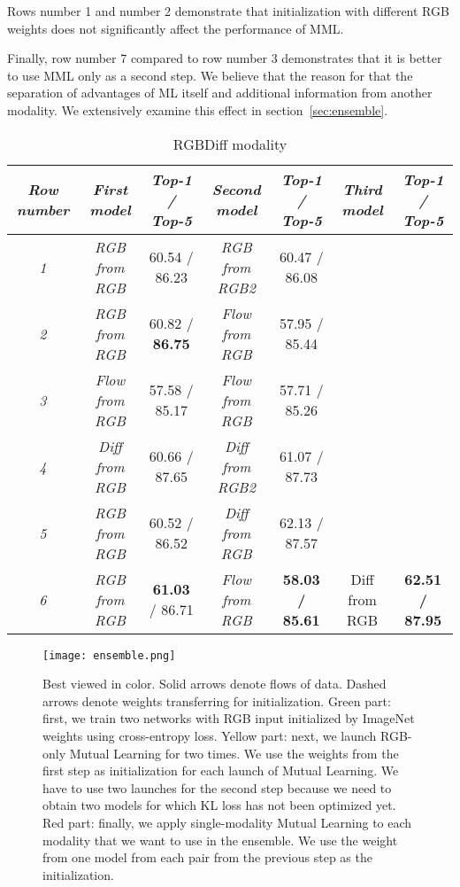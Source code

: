 \documentclass[conference]{IEEEtran}
\begin{document}
Rows number 1 and number 2 demonstrate that initialization with different RGB weights does not significantly affect the performance of MML.

Finally, row number 7 compared to row number 3 demonstrates that it is better to use MML only as a second step. We believe that the reason for that the separation of advantages of ML itself and additional information from another modality. We extensively examine this effect in section~\ref{sec:ensemble}.

\begin{table*}[!t]
	\centering
	\caption{RGBDiff modality}
	\label{tab:diff}
	\centering
	\begin{tabular}{|c|c|c|c|c|c|c|} 
		\hline \it Row number & \it First model & \it Top-1 / Top-5 & \it Second model & \it Top-1 / Top-5 & \it Third model & \it Top-1 / Top-5 \\ \hline
		\it 1 & \it RGB from RGB & 60.54 / 86.23 & \it RGB from RGB2 & 60.47 / 86.08 & & \\ \hline
		\it 2 & \it RGB from RGB & 60.82 / \textbf{86.75} & \it Flow from RGB & 57.95 / 85.44 & & \\ \hline
		\it 3 & \it Flow from RGB & 57.58 / 85.17 & \it Flow from RGB & 57.71 / 85.26 & & \\ \hline
		\it 4 & \it Diff from RGB & 60.66 / 87.65 & \it Diff from RGB2 & 61.07 / 87.73 & & \\ \hline
		\it 5 & \it RGB from RGB & 60.52 / 86.52 & \it Diff from RGB & 62.13 / 87.57 & & \\ \hline
		\it 6 & \it RGB from RGB & \textbf{61.03} / 86.71 & \it Flow from RGB & \bf 58.03 / 85.61 & Diff from RGB & \bf 62.51 / 87.95 \\ \hline
		
	\end{tabular}
\end{table*}

\begin{figure*}[!t]
	\centering
	\texttt{[image: ensemble.png]}
	\caption{Best viewed in color. Solid arrows denote flows of data. Dashed arrows denote weights transferring for initialization.
		Green part: first, we train two networks with RGB input initialized by ImageNet weights using cross-entropy loss.
		Yellow part: next, we launch RGB-only Mutual Learning for two times. We use the weights from the first step as initialization for each launch of Mutual Learning. We have to use two launches for the second step because we need to obtain two models for which KL loss has not been optimized yet.
		Red part: finally, we apply single-modality Mutual Learning to each modality that we want to use in the ensemble. We use the weight from one model from each pair from the previous step as the initialization.}
	\label{fig:ensemble}
\end{figure*}
\end{document}

